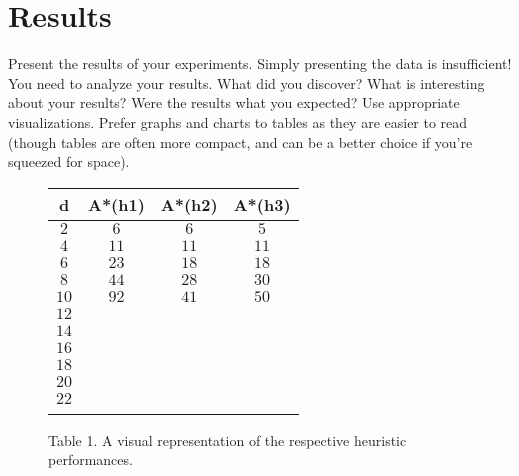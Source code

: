 
\section{Results}
\label{sec:results}

Present the results of your experiments. Simply presenting the data is
insufficient! You need to analyze your results. What did you discover?
What is interesting about your results? Were the results what you
expected? Use appropriate visualizations. Prefer graphs and charts to
tables as they are easier to read (though tables are often more
compact, and can be a better choice if you're squeezed for space).


\begin{figure}[htb]
  \centering %

  \begin{tabular}{|c|c|c|c|} 
    \hline \hline %
    \rule{0pt}{4ex} d & A*(h1) & A*(h2) & A*(h3) \\ %
    \hline %
   \rule{0pt}{4ex} $2$ & $6$ & $6$ & $5$\\
    $4$ & $11$ & $11$ & $11$\\
    $6$ & $23$ & $18$ & $18$\\
    $8$ & $44$ & $28$ & $30$\\
    $10$ & $92$ & $41$ & $50$\\
    $12$ & $ $ & $ $ & $ $\\
    $14$ & $ $ & $ $ & $ $\\
    $16$ & $ $ & $ $ & $ $\\
    $18$ & $ $ & $ $ & $ $\\
    $20$ & $ $ & $ $ & $ $\\
    $22$ & $ $ & $ $ & $ $\\
    $ $ & $ $ & $ $ & $ $\\
    \hline \hline
  \end{tabular}

  \caption{Table 1. A visual representation of the respective heuristic performances.}
  \label{tab:example}

\end{figure}

